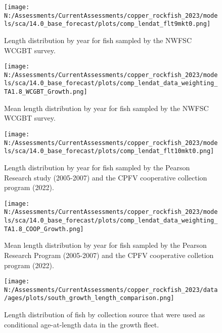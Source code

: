 \documentclass[11pt,
  english,
  letterpaper,
]{article}
\begin{document}
\pagebreak

\begin{figure}
\centering
\texttt{[image: N:/Assessments/CurrentAssessments/copper\_rockfish\_2023/models/sca/14.0\_base\_forecast/plots/comp\_lendat\_flt9mkt0.png]}
\caption{Length distribution by year for fish sampled by the NWFSC WCGBT survey.\label{fig:growth-wcgbt-len}}
\end{figure}

\pagebreak

\begin{figure}
\centering
\texttt{[image: N:/Assessments/CurrentAssessments/copper\_rockfish\_2023/models/sca/14.0\_base\_forecast/plots/comp\_lendat\_data\_weighting\_TA1.8\_WCGBT\_Growth.png]}
\caption{Mean length distribution by year for fish sampled by the NWFSC WCGBT survey.\label{fig:growth-mean-wcgbt-len}}
\end{figure}

\pagebreak

\begin{figure}
\centering
\texttt{[image: N:/Assessments/CurrentAssessments/copper\_rockfish\_2023/models/sca/14.0\_base\_forecast/plots/comp\_lendat\_flt10mkt0.png]}
\caption{Length distribution by year for fish sampled by the Pearson Research study (2005-2007) and the CPFV cooperative collection program (2022).\label{fig:growth-coop-len}}
\end{figure}

\pagebreak

\begin{figure}
\centering
\texttt{[image: N:/Assessments/CurrentAssessments/copper\_rockfish\_2023/models/sca/14.0\_base\_forecast/plots/comp\_lendat\_data\_weighting\_TA1.8\_COOP\_Growth.png]}
\caption{Mean length distribution by year for fish sampled by the Pearson Research Program (2005-2007) and the CPFV cooperative colletion program (2022).\label{fig:growth-mean-coop-len}}
\end{figure}

\pagebreak

\begin{figure}
\centering
\texttt{[image: N:/Assessments/CurrentAssessments/copper\_rockfish\_2023/data/ages/plots/south\_growth\_length\_comparison.png]}
\caption{Length distribution of fish by collection source that were used as conditional age-at-length data in the growth fleet.\label{fig:growth-len-dist}}
\end{figure}
\end{document}
